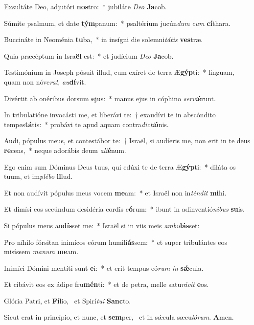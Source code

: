 \item Exsultáte Deo, adjutóri \textbf{nos}tro:~* jubiláte \textit{De}\textit{o} \textbf{Ja}cob.
\item Súmite psalmum, et date \textbf{tým}panum:~* psaltérium jucún\textit{dum} \textit{cum} \textbf{cí}thara.
\item Buccináte in Neoménia \textbf{tu}ba,~* in insígni die solemni\textit{tá}\textit{tis} \textbf{ves}træ.
\item Quia præcéptum in Isra\textbf{ël} est:~* et judícium \textit{De}\textit{o} \textbf{Ja}cob.
\item Testimónium in Joseph pósuit illud, cum exíret de terra Æ\textbf{gýp}ti:~* linguam, quam non nóve\textit{rat}, \textit{au}\textbf{dí}vit.
\item Divértit ab onéribus dorsum \textbf{e}jus:~* manus ejus in cóphino \textit{ser}\textit{vi}\textbf{é}runt.
\item In tribulatióne invocásti me, et liberávi te:~† exaudívi te in abscóndito tempes\textbf{tá}tis:~* probávi te apud aquam contra\textit{dic}\textit{ti}\textbf{ó}nis.
\item Audi, pópulus meus, et contestábor te:~† Israël, si audíeris me, non erit in te deus \textbf{re}cens,~* neque adorábis deum \textit{a}\textit{li}\textbf{é}num.
\item Ego enim sum Dóminus Deus tuus, qui edúxi te de terra Æ\textbf{gýp}ti:~* diláta os tuum, et im\textit{plé}\textit{bo} \textbf{il}lud.
\item Et non audívit pópulus meus vocem \textbf{me}am:~* et Israël non in\textit{tén}\textit{dit} \textbf{mi}hi.
\item Et dimísi eos secúndum desidéria cordis e\textbf{ó}rum:~* ibunt in adinventió\textit{ni}\textit{bus} \textbf{su}is.
\item Si pópulus meus au\textbf{dís}set me:~* Israël si in viis meis \textit{am}\textit{bu}\textbf{lás}set:
\item Pro níhilo fórsitan inimícos eórum humili\textbf{ás}sem:~* et super tribulántes eos misíssem \textit{ma}\textit{num} \textbf{me}am.
\item Inimíci Dómini mentíti sunt \textbf{e}i:~* et erit tempus eó\textit{rum} \textit{in} \textbf{sǽ}cula.
\item Et cibávit eos ex ádipe fru\textbf{mén}ti:~* et de petra, melle satu\textit{rá}\textit{vit} \textbf{e}os.
\item Glória Patri, et \textbf{Fí}lio,~\psstar{} et Spirí\textit{tu}\textit{i} \textbf{Sanc}to.
\item Sicut erat in princípio, et nunc, et \textbf{sem}per,~\psstar{} et in sǽcula sæcu\textit{ló}\textit{rum}. \textbf{A}men.
